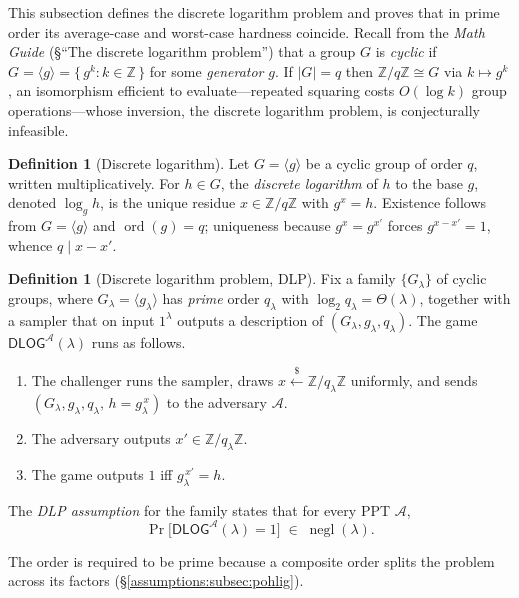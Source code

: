 \documentclass[11pt,a4paper]{article}
\theoremstyle{definition}
\newtheorem{definition}[theorem]{Definition}
\theoremstyle{remark}
\newcommand{\Z}{\ensuremath{\mathbb{Z}}}
\DeclareMathOperator{\ord}{ord}
\DeclareMathOperator{\negl}{negl}
\providecommand{\abs}[1]{\lvert #1 \rvert}
\begin{document}
This subsection defines the discrete logarithm problem and proves that
in prime order its average-case and worst-case hardness coincide.
Recall from the \emph{Math Guide}
(\S``The discrete logarithm problem'') that a group \(G\) is
\emph{cyclic} if \(G = \langle g \rangle = \{\, g^{k} : k \in \Z \,\}\)
for some \emph{generator} \(g\).
If \(\abs{G} = q\) then \(\Z/q\Z \cong G\) via \(k \mapsto g^{k}\), an
isomorphism efficient to evaluate---repeated squaring costs
\(O(\log k)\) group operations---whose inversion, the discrete
logarithm problem, is conjecturally infeasible.

\begin{definition}[Discrete logarithm]
\label{assumptions:def:dlog}
Let \(G = \langle g \rangle\) be a cyclic group of order \(q\),
written multiplicatively. For \(h \in G\), the \emph{discrete
logarithm} of \(h\) to the base \(g\), denoted \(\log_g h\), is the
unique residue \(x \in \Z/q\Z\) with \(g^{x} = h\). Existence follows
from \(G = \langle g\rangle\) and \(\ord(g) = q\); uniqueness because
\(g^{x} = g^{x'}\) forces \(g^{x - x'} = 1\), whence
\(q \mid x - x'\).
\end{definition}

\begin{definition}[Discrete logarithm problem, DLP]
\label{assumptions:def:dlp}
Fix a family \(\{G_\lambda\}\) of cyclic groups, where
\(G_\lambda = \langle g_\lambda\rangle\) has \emph{prime} order
\(q_\lambda\) with \(\log_2 q_\lambda = \Theta(\lambda)\), together
with a sampler that on input \(1^{\lambda}\) outputs a description of
\((G_\lambda, g_\lambda, q_\lambda)\). The game
\(\mathsf{DLOG}^{\mathcal A}(\lambda)\) runs as follows.
\begin{enumerate}
\item The challenger runs the sampler, draws
  \(x \xleftarrow{\$} \Z/q_\lambda\Z\) uniformly, and sends
  \((G_\lambda, g_\lambda, q_\lambda,\, h = g_\lambda^{\,x})\) to the
  adversary \(\mathcal A\).
\item The adversary outputs \(x' \in \Z/q_\lambda\Z\).
\item The game outputs \(1\) iff \(g_\lambda^{\,x'} = h\).
\end{enumerate}
The \emph{DLP assumption} for the family states that for every PPT
\(\mathcal A\),
\[
\Pr\bigl[\mathsf{DLOG}^{\mathcal A}(\lambda) = 1\bigr]
  \;\in\; \negl(\lambda).
\]
\end{definition}

The order is required to be prime because a composite order splits the
problem across its factors (\S\ref{assumptions:subsec:pohlig}).
\end{document}
